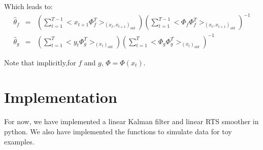 \documentclass[11pt, oneside]{amsart}
\begin{document}
Which leads to:
\begin{eqnarray}
\hat{\theta}_f&=&(\sum_{t=1}^{T-1}{<x_{t+1}\Phi_f^T >_{(x_t,x_{t+1})_{old}}})(\sum_{t=1}^{T-1}{<\Phi_f\Phi_f^T >_{(x_t,x_{t+1})_{old}}})^{-1}\\
\hat{\theta}_g&=&(\sum_{t=1}^{T}{<y_{t}\Phi_g^T >_{(x_t)_{old}}})(\sum_{t=1}^{T}{<\Phi_g\Phi_g^T >_{(x_t)_{old}}})^{-1}
\end{eqnarray}

Note that implicitly,for $f$ and $g$, $\Phi=\Phi(x_t)$. \\

\section{Implementation}

For now, we have implemented a linear Kalman filter and linear RTS smoother in python. We also have implemented the functions to simulate data for toy examples.
\end{document}
